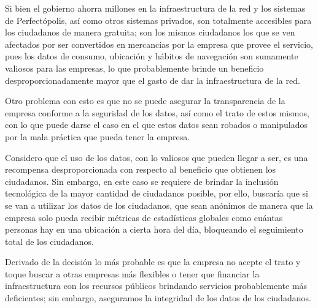 Si bien el gobierno ahorra millones en la infraestructura de la red y los sistemas de Perfectópolis, así como otros sistemas privados, son totalmente accesibles para los ciudadanos de manera gratuita; son los mismos ciudadanos los que se ven afectados por ser convertidos en mercancías por la empresa que provee el servicio, pues los datos de consumo, ubicación y hábitos de navegación son sumamente valiosos para las empresas, lo que probablemente brinde un beneficio desproporcionadamente mayor que el gasto de dar la infraestructura de la red.

Otro problema con esto es que no se puede asegurar la transparencia de la empresa conforme a la seguridad de los datos, así como el trato de estos mismos, con lo que puede darse el caso en el que estos datos sean robados o manipulados por la mala práctica que pueda tener la empresa.

Considero que el uso de los datos, con lo valiosos que pueden llegar a ser, es una recompensa desproporcionada con respecto al beneficio que obtienen los ciudadanos. Sin embargo, en este caso se requiere de brindar la inclusión tecnológica de la mayor cantidad de ciudadanos posible, por ello, buscaría que si se van a utilizar los datos de los ciudadanos, que sean anónimos de manera que la empresa solo pueda recibir métricas de estadísticas globales como cuántas personas hay en una ubicación a cierta hora del día, bloqueando el seguimiento total de los ciudadanos.

Derivado de la decisión lo más probable es que la empresa no acepte el trato y toque buscar a otras empresas más flexibles o tener que financiar la infraestructura con los recursos públicos brindando servicios probablemente más deficientes; sin embargo, aseguramos la integridad de los datos de los ciudadanos.
